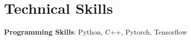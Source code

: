 \documentclass[letterpaper,11pt]{article}
\begin{document}
%
\section{Technical Skills}
 \begin{itemize}[leftmargin=0.15in, label={}]
    \small{\item{
     \textbf{Programming Skills}{: Python, C++, Pytorch, Tensorflow} \\
    }}
 \end{itemize}

 
 
 \vspace{-16pt}
\end{document}
